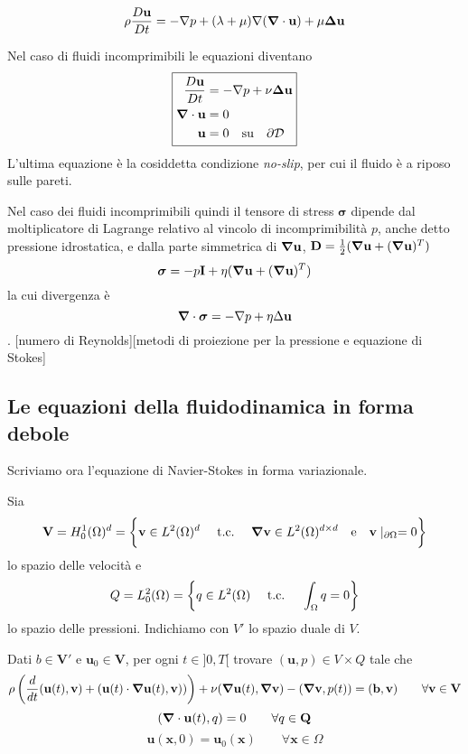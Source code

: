 $$\rho \frac{D\mathbf{u}}{Dt} = -\nabla p + (\lambda+\mu) \nabla(\boldsymbol{\nabla} \cdot \mathbf{u}) + \mu \boldsymbol{\Delta} \mathbf{u}$$

Nel caso di fluidi incomprimibili le equazioni diventano
\begin{equation}
\boxed{
\begin{aligned}
\frac{D\mathbf{u}}{Dt} &= - \nabla p + \nu \boldsymbol{\Delta} \mathbf{u} \\
\boldsymbol{\nabla} \cdot  \mathbf{u} &= 0 \\
\mathbf{u} &= 0 \quad \text{su} \quad \partial \mathcal{D}
\end{aligned}
}
\end{equation}
L'ultima equazione è la cosiddetta condizione \emph{no-slip}, per cui il fluido è a riposo sulle pareti.

Nel caso dei fluidi incomprimibili quindi il tensore di stress $\boldsymbol{\sigma}$ dipende dal moltiplicatore di Lagrange relativo al vincolo di incomprimibilità $p$, anche detto pressione idrostatica, e dalla parte simmetrica di $\boldsymbol{\nabla}\mathbf{u}$, $\mathbf{D}=\frac{1}{2}(\boldsymbol{\nabla}\mathbf{u}+(\boldsymbol{\nabla}\mathbf{u})^{T})$
$$\boldsymbol{\sigma}=-p\mathbf{I}+\eta(\boldsymbol{\nabla}\mathbf{u}+(\boldsymbol{\nabla}\mathbf{u})^{T})$$
la cui divergenza è
$$\boldsymbol{\nabla}\cdot\boldsymbol{\sigma}=-\nabla p+\eta\Delta\mathbf{u}$$.
[numero di Reynolds][metodi di proiezione per la pressione e equazione di Stokes]

\subsection{Le equazioni della fluidodinamica in forma debole}
Scriviamo ora l'equazione di Navier-Stokes in forma variazionale.

Sia
$$\mathbf{V} = H^1_0(\Omega)^d = \bigg \{ \mathbf{v} \in L^2(\Omega)^d \quad \ \text{t.c.}\  \quad \boldsymbol{\nabla} \mathbf{v} \in L^2(\Omega)^{d \times d} \quad \text{e} \quad \mathbf{v}\mid_{\partial \Omega} = 0 \bigg \} $$
lo spazio delle velocità e 
$$Q = L^2_0(\Omega) = \left  \{ q \in L^2(\Omega) \quad \ \text{t.c.}\  \quad \int_{\Omega}q=0 \right  \}$$ lo spazio delle pressioni. Indichiamo con $V'$ lo spazio duale di $V$.

Dati $b \in \mathbf{V}'$ e $\mathbf{u}_0 \in \mathbf{V}$, per ogni $t \in ]0,T[$ trovare $(\mathbf{u},p) \in V \times Q$ tale che
\begin{multline*}
\rho \left ( \frac{d}{dt}\ps{\mathbf{u}(t)}{\mathbf{v}} + \ps{\mathbf{u}(t)\cdot \Nabla\mathbf{u}(t)}{\mathbf{v})}\right)+ \nu\ps{\Nabla\mathbf{u}(t)}{\Nabla\mathbf{v}}-\ps{\Nabla \mathbf{v}}{p(t)}=\ps{\mathbf{b}}{\mathbf{v}} \qquad \forall \mathbf{v}\in\mathbf{V}
\end{multline*}
$$\ps{\Nabla\cdot\mathbf{u}(t)}{q}=0 \qquad \forall q\in\mathbf{Q}$$
$$\mathbf{u}(\mathbf{x},0)=\mathbf{u}_0(\mathbf{x}) \qquad \forall \mathbf{x}\in\Omega$$

